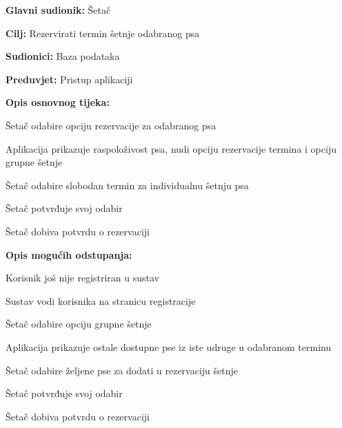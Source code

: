 					\noindent {}
					\begin{packed_item}
	
						\item \textbf{Glavni sudionik:} Šetač
						\item  \textbf{Cilj:} Rezervirati termin šetnje odabranog psa
						\item  \textbf{Sudionici:} Baza podataka
						\item  \textbf{Preduvjet:} Pristup aplikaciji
						\item  \textbf{Opis osnovnog tijeka:}
						
						\item[] \begin{packed_enum}
							\item Šetač odabire opciju rezervacije za odabranog psa
							\item Aplikacija prikazuje raspoloživost psa, nudi opciju rezervacije termina i opciju grupne šetnje
							\item Šetač odabire slobodan termin za individualnu šetnju psa
							\item Šetač potvrđuje svoj odabir
							\item Šetač dobiva potvrdu o rezervaciji
						\end{packed_enum}
						
						\item  \textbf{Opis mogućih odstupanja:}
						
						\item[] \begin{packed_item}
							\item[2.a] Korisnik još nije registriran u sustav
							\item[] \begin{packed_enum}
								\item Sustav vodi korisnika na stranicu registracije
							\end{packed_enum}
							\item[3.a] Šetač odabire opciju grupne šetnje
							\item[] \begin{packed_enum}
								\item Aplikacija prikazuje ostale dostupne pse iz iste udruge u odabranom terminu
								\item Šetač odabire željene pse za dodati u rezervaciju šetnje
								\item Šetač potvrđuje svoj odabir
								\item Šetač dobiva potvrdu o rezervaciji
							\end{packed_enum}
	
						\end{packed_item}
					\end{packed_item}
					

